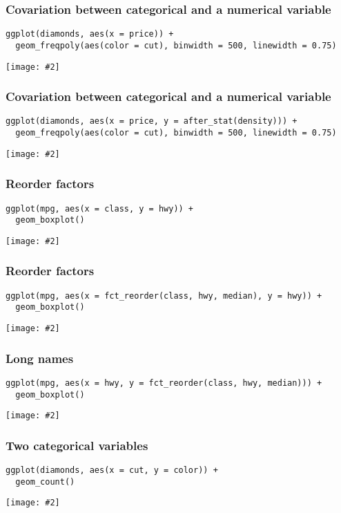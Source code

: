 \documentclass{beamer}
\newcommand{\fig}[2]{\centerline{\texttt{[image: \#2]}}}
\newcommand{\bfr}[1]{\begin{frame}[fragile]\frametitle{{ #1 }}}
\begin{document}
\bfr{Covariation between categorical and a numerical variable}\scriptsize
\begin{verbatim}
ggplot(diamonds, aes(x = price)) + 
  geom_freqpoly(aes(color = cut), binwidth = 500, linewidth = 0.75)
\end{verbatim}
\fig{.8}{unnamed-chunk-15-1.png}
\end{frame}



\bfr{Covariation between categorical and a numerical variable}\scriptsize
\begin{verbatim}
ggplot(diamonds, aes(x = price, y = after_stat(density))) + 
  geom_freqpoly(aes(color = cut), binwidth = 500, linewidth = 0.75)
\end{verbatim}
\fig{.8}{unnamed-chunk-16-1.png}
\end{frame}





\bfr{Reorder factors}\scriptsize
\begin{verbatim}
ggplot(mpg, aes(x = class, y = hwy)) +
  geom_boxplot()
\end{verbatim}
\fig{.8}{unnamed-chunk-18-1.png}
\end{frame}



\bfr{Reorder factors}\scriptsize
\begin{verbatim}
ggplot(mpg, aes(x = fct_reorder(class, hwy, median), y = hwy)) +
  geom_boxplot()
\end{verbatim}
\fig{.8}{unnamed-chunk-19-1.png}
\end{frame}





\bfr{Long names}\scriptsize
\begin{verbatim}
ggplot(mpg, aes(x = hwy, y = fct_reorder(class, hwy, median))) +
  geom_boxplot()
\end{verbatim}
\fig{.8}{unnamed-chunk-20-1.png}
\end{frame}





\bfr{Two categorical variables}\scriptsize
\begin{verbatim}
ggplot(diamonds, aes(x = cut, y = color)) +
  geom_count()
\end{verbatim}
\fig{.8}{unnamed-chunk-21-1.png}
\end{frame}
\end{document}
